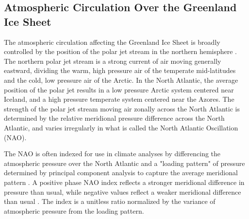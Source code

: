 \documentclass[11pt]{report}
\begin{document}



\subsection{Atmospheric Circulation Over the Greenland Ice Sheet}
The atmospheric circulation affecting the Greenland Ice Sheet is broadly controlled by the position of the polar jet stream in the northern hemisphere \cite[][]{hanna2013,mattingly2018}. The northern polar jet stream is a strong current of air moving generally eastward, dividing the warm, high pressure air of the temperate mid-latitudes and the cold, low pressure air of the Arctic. In the North Atlantic, the average position of the polar jet results in a low pressure Arctic system centered near Iceland, and a high pressure temperate system centered near the Azores. The strength of the polar jet stream moving air zonally across the North Atlantic is determined by the relative meridional pressure difference across the North Atlantic, and varies irregularly in what is called the North Atlantic Oscillation (NAO).

The NAO is often indexed for use in climate analyses by differencing the atmospheric pressure over the North Atlantic and a "loading pattern" of pressure determined by principal component analysis to capture the average meridional pattern \cite[][]{hurrelNAO,cpcNAO}. A positive phase NAO index reflects a stronger meridional difference in pressure than usual, while negative values reflect a weaker meridional difference than usual \cite[][]{hurrelNAO}. The index is a unitless ratio normalized by the variance of atmospheric pressure from the loading pattern.
\end{document}
